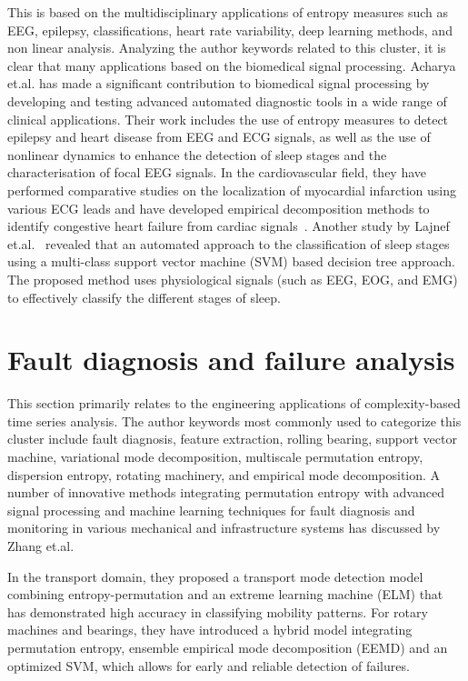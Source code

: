 This is based on the multidisciplinary applications of entropy measures such as EEG, epilepsy, classifications, heart rate variability, deep learning methods, and non linear analysis. Analyzing the author keywords related to this cluster, it is clear that many applications based on the biomedical signal processing. 
Acharya et.al. has made a significant contribution to biomedical signal processing by developing and testing advanced automated diagnostic tools in a wide range of clinical applications. Their work includes the use of entropy measures to detect epilepsy and heart disease from EEG and ECG signals, as well as the use of nonlinear dynamics to enhance the detection of sleep stages and the characterisation of focal EEG signals. In the cardiovascular field, they have performed comparative studies on the localization of myocardial infarction using various ECG leads and have developed empirical decomposition methods to identify congestive heart failure from cardiac
signals~\cite{Acharya2015, Acharya2015a, Acharya2016, Acharya2017, Acharya2017a, Acharya2018, Acharya2019}. Another study by Lajnef et.al.~\cite{Lajnef2015} revealed that an automated approach to the classification of sleep stages using a multi-class support vector machine (SVM) based decision tree approach. The proposed method uses physiological signals (such as EEG, EOG, and EMG) to effectively classify the different stages of sleep.

\section{Fault diagnosis and failure analysis}\label{Sec:ReviewTopicFault}
This section primarily relates to the engineering applications of complexity-based time series analysis. The author keywords most commonly used to categorize this cluster include fault diagnosis, feature extraction, rolling bearing, support vector machine, variational mode decomposition, multiscale permutation entropy, dispersion entropy, rotating machinery, and empirical mode decomposition. 
A number of innovative methods integrating permutation entropy with advanced signal processing and machine learning techniques for fault diagnosis and monitoring in various mechanical and infrastructure systems has discussed by
 Zhang et.al. 

In the transport domain, they proposed a transport mode detection model combining entropy-permutation and an extreme learning machine (ELM) that has demonstrated high accuracy in classifying mobility patterns. 
For rotary machines and bearings, they have introduced a hybrid model integrating permutation entropy, ensemble empirical mode decomposition (EEMD) and an optimized SVM, which allows for early and reliable detection of failures. 

